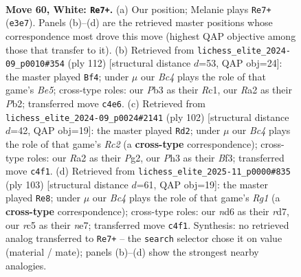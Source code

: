 \documentclass[11pt]{article}
\begin{document}
\clearpage

\begin{figure}[p]\centering
\begin{subfigure}{0.46\textwidth}\centering
\resizebox{\linewidth}{!}{%
\newchessgame
\chessboard[
  setfen={7r/p5kp/P2n4/2r5/2B5/1Pp1R1KP/R1P3P1/8 w - - 0 60},
  showmover=false,
  pgfstyle=straightmove, color=movearrow, markmove={e3-e7}
]}
\caption{}
\end{subfigure}\hfill
\begin{subfigure}{0.46\textwidth}\centering
\resizebox{\linewidth}{!}{%
\newchessgame
\chessboard[
  setfen={8/1p3kp1/8/1bPrB2p/p6P/P4PK1/1P4P1/2R5 w - - 48 57},
  showmover=false,
  pgfstyle=straightmove, color=movearrow, markmove={e5-f4}
]}
\caption{}
\end{subfigure}
\\[4pt]
\begin{subfigure}{0.46\textwidth}\centering
\resizebox{\linewidth}{!}{%
\newchessgame
\chessboard[
  setfen={8/3r1pk1/6p1/8/1n1P3p/pP3B1P/P1R3PK/8 w - - 1 52},
  showmover=false,
  pgfstyle=straightmove, color=movearrow, markmove={c2-d2}
]}
\caption{}
\end{subfigure}\hfill
\begin{subfigure}{0.46\textwidth}\centering
\resizebox{\linewidth}{!}{%
\newchessgame
\chessboard[
  setfen={6rk/3RN1p1/5p1p/7P/3p1P2/2b2KP1/8/8 b - - 3 52},
  showmover=false,
  pgfstyle=straightmove, color=movearrow, markmove={g8-e8}
]}
\caption{}
\end{subfigure}
\caption{\textbf{Move 60, White: \texttt{Re7+}.} (a) Our position; Melanie plays \texttt{Re7+} (\texttt{e3e7}). Panels (b)--(d) are the retrieved master positions whose correspondence most drove this move (highest QAP objective among those that transfer to it). (b) Retrieved from \texttt{lichess\_elite\_2024-09\_p0010\#354} (ply 112) [structural distance $d$=53, QAP obj=24]: the master played \texttt{Bf4}; under $\mu$ our \emph{Bc4} plays the role of that game's \emph{Be5}; cross-type roles: our \emph{P}b3 as their \emph{R}c1, our \emph{R}a2 as their \emph{P}b2; transferred move \texttt{c4e6}. (c) Retrieved from \texttt{lichess\_elite\_2024-09\_p0024\#2141} (ply 102) [structural distance $d$=42, QAP obj=19]: the master played \texttt{Rd2}; under $\mu$ our \emph{Bc4} plays the role of that game's \emph{Rc2} (a \textbf{cross-type} correspondence); cross-type roles: our \emph{R}a2 as their \emph{P}g2, our \emph{P}h3 as their \emph{B}f3; transferred move \texttt{c4f1}. (d) Retrieved from \texttt{lichess\_elite\_2025-11\_p0000\#835} (ply 103) [structural distance $d$=61, QAP obj=19]: the master played \texttt{Re8}; under $\mu$ our \emph{Bc4} plays the role of that game's \emph{Rg1} (a \textbf{cross-type} correspondence); cross-type roles: our \emph{n}d6 as their \emph{r}d7, our \emph{r}c5 as their \emph{n}e7; transferred move \texttt{c4f1}. Synthesis: no retrieved analog transferred to \texttt{Re7+} -- the \texttt{search} selector chose it on value (material / mate); panels (b)--(d) show the strongest nearby analogies.}
\label{fig:thought-m118}
\end{figure}
\end{document}
